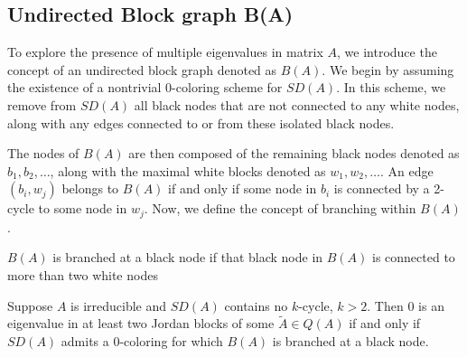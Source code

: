 \subsection*{Undirected Block graph B(A)}
To explore the presence of multiple eigenvalues in matrix $A$, we introduce the concept of an undirected block graph denoted as $B(A)$. We begin by assuming the existence of a nontrivial 0-coloring scheme for $SD(A)$. In this scheme, we remove from $SD(A)$ all black nodes that are not connected to any white nodes, along with any edges connected to or from these isolated black nodes.

The nodes of $B(A)$ are then composed of the remaining black nodes denoted as ${b_1, b_2, \ldots}$, along with the maximal white blocks denoted as ${w_1, w_2, \ldots}$. An edge ${(b_i, w_j)}$ belongs to $B(A)$ if and only if some node in $b_i$ is connected by a 2-cycle to some node in $w_j$.
Now, we define the concept of branching within $B(A)$. 
\begin{dfn}
	$B(A)$ is branched at a black node if that black node in $B(A)$ is connected to more than two white nodes
\end{dfn} 

\begin{thm}
	Suppose $A$ is irreducible and $SD(A)$ contains no $k$-cycle, $k > 2$. Then 0 is an eigenvalue in at least two Jordan blocks of some $\tilde{A} \in Q(A)$ if and only if $SD(A)$ admits a 0-coloring for which $B(A)$ is branched at a black node.
\end{thm}


